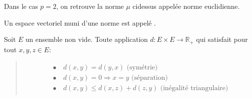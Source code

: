 \documentclass[letterpaper,11pt,english]{sphinxmanual}
\begin{document}
\begin{DUlineblock}{0em}
\item[] Dans le cas \(p=2\), on retrouve la norme \(\mu\) ci\sphinxhyphen{}dessus
appelée norme euclidienne.
\end{DUlineblock}

\begin{DUlineblock}{0em}
\item[]  Un espace vectoriel muni d’une norme est appelé
.
\item[] 
\item[] Soit \(E\) un ensemble non vide. Toute application
\(d:E \times E \rightarrow \mathbb{R}_{+}\) qui satisfait pour
tout \(x, y, z \in E\):
\end{DUlineblock}
\begin{quote}
\begin{equation}\label{equation:chapter2:chapter2:19}
\begin{split}\begin{aligned}
    &\bullet \quad d(x,y) = d(y,x) \text{ (symétrie)}\\
    &\bullet \quad d(x,y) = 0 \Longrightarrow x=y\text{ (séparation)}\\
    &\bullet \quad d(x,y) \le d(x,z)+d(z,y) \text{ (inégalité triangulaire)}\end{aligned}\end{split}
\end{equation}\end{quote}
\end{document}
